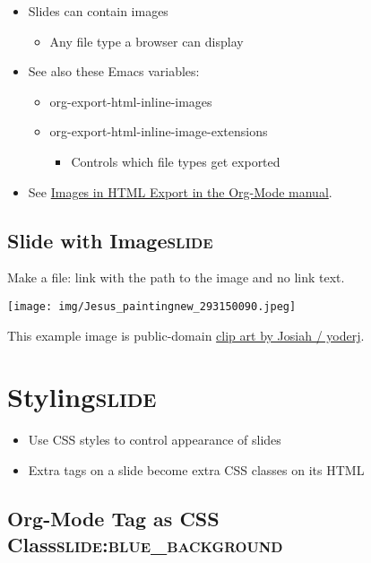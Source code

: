 \documentclass[11pt]{article}
\begin{document}
\begin{itemize}
\item Slides can contain images
\begin{itemize}
\item Any file type a browser can display
\end{itemize}
\item See also these Emacs variables:
\begin{itemize}
\item org-export-html-inline-images
\item org-export-html-inline-image-extensions
\begin{itemize}
\item Controls which file types get exported
\end{itemize}
\end{itemize}
\item See \href{http://orgmode.org/manual/Images-in-HTML-export.html}{Images in HTML Export in the Org-Mode manual}.
\end{itemize}

\subsection{Slide with Image\hfill{}\textsc{slide}}
\label{sec:orgheadline66}

Make a file: link with the path to the image and no link text.

\texttt{[image: img/Jesus\_paintingnew\_293150090.jpeg]} 

This example image is public-domain \href{http://openclipart.org/detail/165554/geodesic_dome-by-yoderj}{clip art by Josiah / yoderj}.

\section{Styling\hfill{}\textsc{slide}}
\label{sec:orgheadline69}

\begin{itemize}
\item Use CSS styles to control appearance of slides
\item Extra tags on a slide become extra CSS classes on its HTML
\end{itemize}

\subsection{Org-Mode Tag as CSS Class\hfill{}\textsc{slide:blue\_background}}
\label{sec:orgheadline68}
\end{document}
